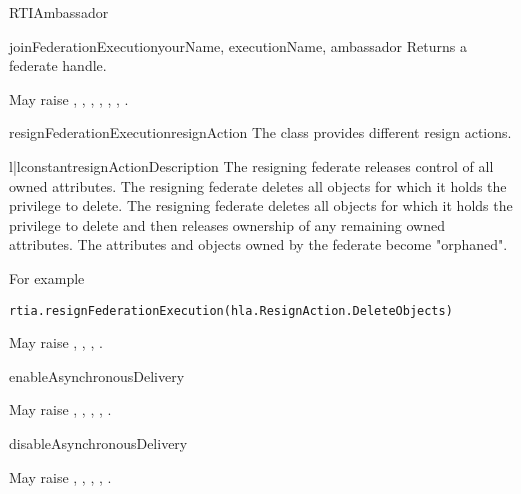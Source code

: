 \begin{classdesc}{RTIAmbassador}{}
\begin{methoddesc}{joinFederationExecution}{yourName, executionName, ambassador}
Returns a federate handle.

May raise
,
,
,
,
,
,
.
\end{methoddesc}

\begin{methoddesc}{resignFederationExecution}{resignAction}
The  class provides different resign actions.

\begin{tableii}{l|l}{constant}{resignAction}{Description}
    {The resigning federate releases control of all owned attributes.}
    {The resigning federate deletes all objects for which it holds the
    privilege to delete.}
    {The resigning federate deletes all objects for which it holds the
    privilege to delete and then releases ownership of any remaining
    owned attributes.}
    {The attributes and objects owned by the federate become "orphaned".}
\end{tableii}

For example
\begin{verbatim} 
rtia.resignFederationExecution(hla.ResignAction.DeleteObjects)
\end{verbatim}

May raise
,
,
,
.
\end{methoddesc}

\begin{methoddesc}{enableAsynchronousDelivery}{}

May raise
,
,
,
,
.
\end{methoddesc}

\begin{methoddesc}{disableAsynchronousDelivery}{}

May raise
,
,
,
,
.
\end{methoddesc}


\end{classdesc}
